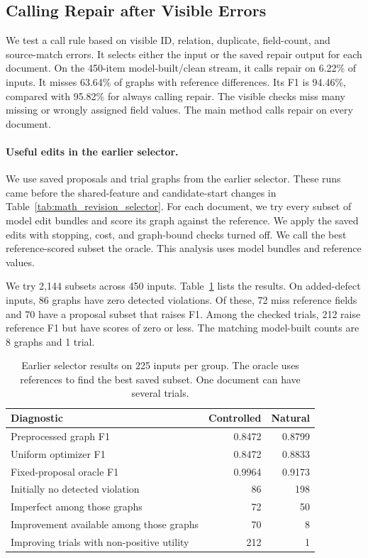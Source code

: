 \subsection{Calling Repair after Visible Errors}
\label{app:call_policy}

We test a call rule based on visible ID, relation, duplicate, field-count,
and source-match errors. It selects either the input or the saved repair
output for each document. On the 450-item model-built/clean stream,
it calls repair on 6.22\% of inputs. It misses 63.64\% of graphs with
reference differences. Its F1 is 94.46\%, compared with 95.82\% for
always calling repair. The visible checks miss many missing or wrongly
assigned field values. The main method calls repair on every document.

\paragraph{Useful edits in the earlier selector.}

We use saved proposals and trial graphs from the earlier selector.
These runs came before the shared-feature and candidate-start changes in
Table~\ref{tab:math_revision_selector}. For each document, we try every
subset of model edit bundles and score its graph against the reference.
We apply the saved edits with stopping, cost, and graph-bound checks turned
off. We call the best reference-scored subset the oracle.
This analysis uses model bundles and reference values.

We try 2,144 subsets across 450 inputs.
Table~\ref{tab:selection_bottlenecks} lists the results.
On added-defect inputs, 86 graphs have zero detected violations.
Of these, 72 miss reference fields and 70 have a proposal subset that raises
F1. Among the checked trials, 212 raise reference F1 but have scores of zero
or less. The matching model-built counts are 8 graphs and 1 trial.

\begin{table}[t]
\centering
\caption{Earlier selector results on 225 inputs per group. The oracle uses references to find the best saved subset. One document can have several trials.}
\label{tab:selection_bottlenecks}
\small
\begin{tabular}{lrr}
\toprule
Diagnostic & Controlled & Natural \\
\midrule
Preprocessed graph F1 & 0.8472 & 0.8799 \\
Uniform optimizer F1 & 0.8472 & 0.8833 \\
Fixed-proposal oracle F1 & 0.9964 & 0.9173 \\
Initially no detected violation & 86 & 198 \\
Imperfect among those graphs & 72 & 50 \\
Improvement available among those graphs & 70 & 8 \\
Improving trials with non-positive utility & 212 & 1 \\
\bottomrule
\end{tabular}
\end{table}

